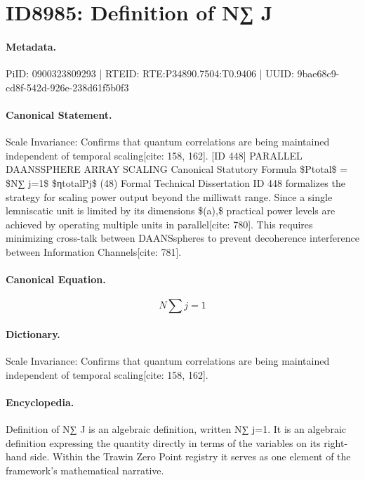 \section*{ID8985: Definition of N∑ J}
\paragraph{Metadata.}
PiID: 0900323809293 | RTEID: RTE:P34890.7504:T0.9406 | UUID: 9bae68c9-cd8f-542d-926e-238d61f5b0f3

\paragraph{Canonical Statement.}
Scale Invariance: Confirms that quantum correlations are being maintained independent of temporal scaling[cite: 158, 162]. [ID 448] PARALLEL DAANSSPHERE ARRAY SCALING Canonical Statutory Formula \$Ptotal\$ = \$N∑ j=1\$ \$ηtotalPj\$ (48) Formal Technical Dissertation ID 448 formalizes the strategy for scaling power output beyond the milliwatt range. Since a single lemniscatic unit is limited by its dimensions \$(a),\$ practical power levels are achieved by operating multiple units in parallel[cite: 780]. This requires minimizing cross-talk between DAANSspheres to prevent decoherence interference between Information Channels[cite: 781].

\paragraph{Canonical Equation.}
\[
N∑ j=1
\]

\paragraph{Dictionary.}
Scale Invariance: Confirms that quantum correlations are being maintained independent of temporal scaling[cite: 158, 162].

\paragraph{Encyclopedia.}
Definition of N∑ J is an algebraic definition, written N∑ j=1. It is an algebraic definition expressing the quantity directly in terms of the variables on its right-hand side. Within the Trawin Zero Point registry it serves as one element of the framework's mathematical narrative.
